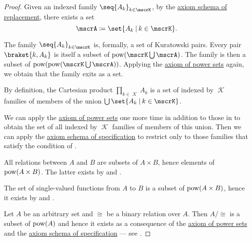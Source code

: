 \begin{proof}
   Given an indexed family \( \seq{ A_k }_{k \in \mscrK} \), by the \hyperref[def:zfc/replacement]{axiom schema of replacement}, there exists a set
  \begin{equation*}
    \mscrA \coloneqq \set{ A_k \given k \in \mscrK }.
  \end{equation*}

  The family \( \seq{ A_k }_{k \in \mscrK} \) is, formally, a set of Kuratowski pairs. Every pair \( \braket{ k, A_k } \) is itself a subset of \( \pow(\mscrK \bigcup \mscrA) \). The family is then a subset of \( \pow(\pow(\mscrK \bigcup \mscrA)) \). Applying the \hyperref[def:zfc/power_set]{axiom of power sets} again, we obtain that the family exits as a set.

   By definition, the Cartesian product \( \prod_{k \in \mscrK} A_k \) is a set of indexed by \( \mscrK \) families of members of the union \( \bigcup\set{ A_k \given k \in \mscrK } \).

  We can apply the \hyperref[def:zfc/power_set]{axiom of power sets} one more time in addition to those in  to obtain the set of all indexed by \( \mscrK \) families of members of this union. Then we can apply the \hyperref[def:zfc/specification]{axiom schema of specification} to restrict only to those families that satisfy the condition of .

   All relations between \( A \) and \( B \) are subsets of \( A \times B \), hence elements of \( \operatorname{pow}(A \times B) \). The latter exists by  and .

   The set of single-valued functions from \( A \) to \( B \) is a subset of \( \operatorname{pow}(A \times B) \), hence it exists by  and .

   Let \( A \) be an arbitrary set and \( \cong \) be a binary relation over \( A \). Then \( A / {\cong} \) is a subset of \( \operatorname{pow}(A) \) and hence it exists as a consequence of the \hyperref[def:zfc/power_set]{axiom of power sets} and the \hyperref[def:zfc/specification]{axiom schema of specification} --- see .


\end{proof}
